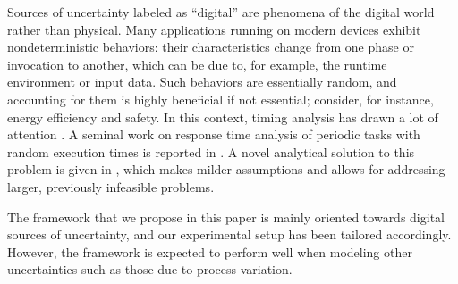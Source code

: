 Sources of uncertainty labeled as ``digital'' are phenomena of the digital world
rather than physical. Many applications running on modern devices exhibit
nondeterministic behaviors: their characteristics change from one phase or
invocation to another, which can be due to, for example, the runtime environment
or input data. Such behaviors are essentially random, and accounting for them is
highly beneficial if not essential; consider, for instance, energy efficiency
and safety. In this context, timing analysis has drawn a lot of attention
\cite{quinton2012}. A seminal work on response time analysis of periodic tasks
with random execution times is reported in \cite{diaz2002}. A novel analytical
solution to this problem is given in \cite{tanasa2015}, which makes milder
assumptions and allows for addressing larger, previously infeasible problems.

The framework that we propose in this paper is mainly oriented towards digital
sources of uncertainty, and our experimental setup has been tailored
accordingly. However, the framework is expected to perform well when modeling
other uncertainties such as those due to process variation.

